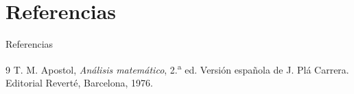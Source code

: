 \section{Referencias}

\begin{frame}{Referencias}
    \footnotesize
    \begin{thebibliography}{9}
        T. M. Apostol,
        \emph{Análisis matemático}, 2.\textsuperscript{a} ed.
        Versión española de J. Plá Carrera.
        Editorial Reverté, Barcelona, 1976.

    \end{thebibliography}
\end{frame}
